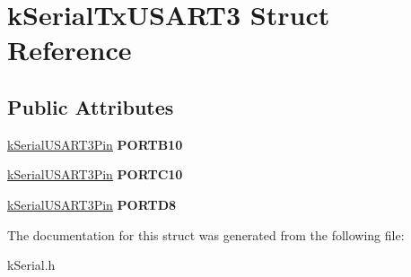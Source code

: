 \hypertarget{structkSerialTxUSART3}{}\section{k\+Serial\+Tx\+U\+S\+A\+R\+T3 Struct Reference}
\label{structkSerialTxUSART3}
\subsection*{Public Attributes}
\begin{DoxyCompactItemize}
\item 
\hyperlink{structkSerialUSART3Pin}{k\+Serial\+U\+S\+A\+R\+T3\+Pin} {\bfseries P\+O\+R\+T\+B10}\hypertarget{structkSerialTxUSART3_a43562e7be051ce9d5ae62065f479ed15}{}\label{structkSerialTxUSART3_a43562e7be051ce9d5ae62065f479ed15}

\item 
\hyperlink{structkSerialUSART3Pin}{k\+Serial\+U\+S\+A\+R\+T3\+Pin} {\bfseries P\+O\+R\+T\+C10}\hypertarget{structkSerialTxUSART3_a9cefc21e2dfa0303becb66fd29990512}{}\label{structkSerialTxUSART3_a9cefc21e2dfa0303becb66fd29990512}

\item 
\hyperlink{structkSerialUSART3Pin}{k\+Serial\+U\+S\+A\+R\+T3\+Pin} {\bfseries P\+O\+R\+T\+D8}\hypertarget{structkSerialTxUSART3_a9ecc954744322543083bde098b74d9db}{}\label{structkSerialTxUSART3_a9ecc954744322543083bde098b74d9db}

\end{DoxyCompactItemize}


The documentation for this struct was generated from the following file\+:\begin{DoxyCompactItemize}
\item 
k\+Serial.\+h\end{DoxyCompactItemize}
